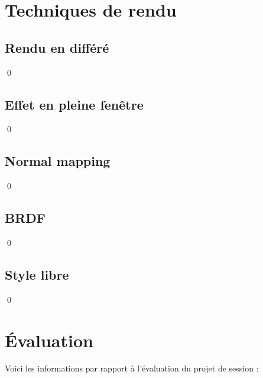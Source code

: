 \documentclass[12pt]{article}
\newcommand{\state}{\noindent}
\begin{document}
\pagebreak

\section{Techniques de rendu}

\subsection{Rendu en différé}

\state

\qed

\subsection{Effet en pleine fenêtre}

\state

\qed

\subsection{Normal mapping}

\state

\qed

\subsection{BRDF}

\state

\qed

\subsection{Style libre}

\state

\qed

\pagebreak

\section*{Évaluation}

\state
Voici les informations par rapport à l'évaluation du projet de session :
\end{document}
